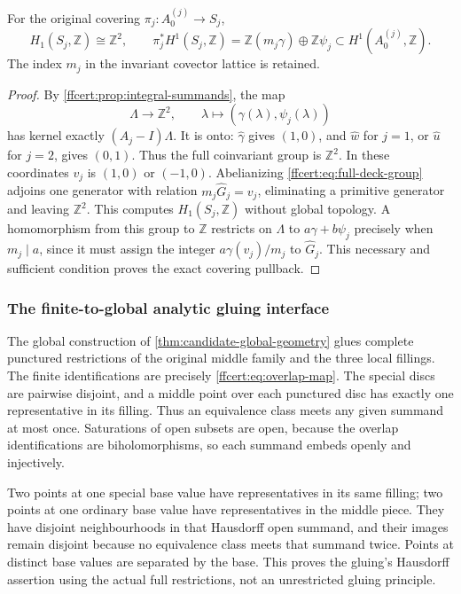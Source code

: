 \begin{corollary}
\label{ffcert:cor:covering-h1}
For the original covering $\pi_j:A_0^{(j)}\to S_j$,
\[
 H_1(S_j,\mathbb Z)\cong\mathbb Z^2,\qquad
 \pi_j^*H^1(S_j,\mathbb Z)
   =\mathbb Z(m_j\gamma)\oplus\mathbb Z\psi_j
        \subset H^1(A_0^{(j)},\mathbb Z).
 \tag{FF40}\label{ffcert:eq:integral-h1-image}
\]
The index $m_j$ in the invariant covector lattice is retained.
\end{corollary}

\begin{proof}
By \cref{ffcert:prop:integral-summands}, the map
\[
 \Lambda\longrightarrow\mathbb Z^2,\qquad
 \lambda\longmapsto(\gamma(\lambda),\psi_j(\lambda))
 \tag{FF41}\label{ffcert:eq:coinvariant-coordinates}
\]
has kernel exactly $(A_j-I)\Lambda$. It is onto:
$\widehat\gamma$ gives $(1,0)$, and $\widehat w$ for $j=1$,
or $\widehat u$ for $j=2$, gives $(0,1)$. Thus the full
coinvariant group is $\mathbb Z^2$. In these coordinates $v_j$
is $(1,0)$ or $(-1,0)$. Abelianizing
\eqref{ffcert:eq:full-deck-group} adjoins one generator with relation
$m_j\widehat G_j=v_j$, eliminating a primitive generator and
leaving $\mathbb Z^2$. This computes $H_1(S_j,\mathbb Z)$ without
global topology. A homomorphism from this group to $\mathbb Z$
restricts on $\Lambda$ to $a\gamma+b\psi_j$ precisely when
$m_j\mid a$, since it must assign the integer
$a\gamma(v_j)/m_j$ to $\widehat G_j$. This necessary and sufficient
condition proves the exact covering pullback.
\end{proof}

\subsubsection{The finite-to-global analytic gluing interface}

The global construction of \cref{thm:candidate-global-geometry} glues
complete punctured restrictions of the original middle family and
the three local fillings. The finite identifications are precisely
\eqref{ffcert:eq:overlap-map}. The special discs are pairwise disjoint,
and a middle point over each punctured disc has exactly one
representative in its filling. Thus an equivalence class meets any
given summand at most once. Saturations of open subsets are open,
because the overlap identifications are biholomorphisms, so each summand
embeds openly and injectively.

Two points at one special base value have representatives in its same
filling; two points at one ordinary base value have representatives in
the middle piece. They have disjoint neighbourhoods in that Hausdorff
open summand, and their images remain disjoint because no equivalence
class meets that summand twice. Points at distinct base values are
separated by the base. This proves the gluing's Hausdorff assertion
using the actual full restrictions, not an unrestricted gluing principle.


